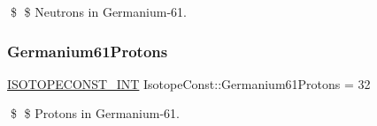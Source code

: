 \$ \$ Neutrons in Germanium-\/61. \mbox{\label{group___isotope_const-_germanium-_ge61_gacdacfb3dd7a2156a40a4f8133c9990e9}} 
\subsubsection{\texorpdfstring{Germanium61\+Protons}{Germanium61Protons}}
{\footnotesize\ttfamily \mbox{\hyperlink{group___isotope_const-_macros_ga5f18360b3e99483a35c32d789e62621c}{I\+S\+O\+T\+O\+P\+E\+C\+O\+N\+S\+T\+\_\+\+I\+NT}} Isotope\+Const\+::\+Germanium61\+Protons = 32}

\$ \$ Protons in Germanium-\/61. 